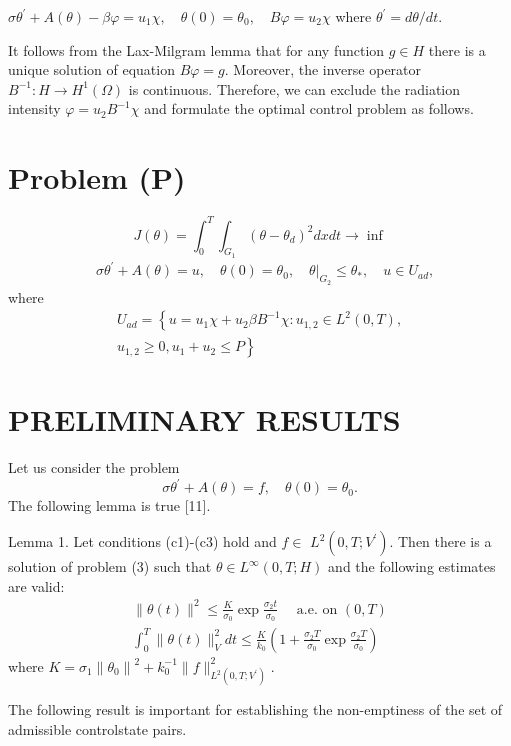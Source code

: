 \documentclass[10pt]{article}
\begin{document}
$\sigma \theta^{\prime}+A(\theta)-\beta \varphi=u_{1} \chi, \quad \theta(0)=\theta_{0}, \quad B \varphi=u_{2} \chi$ where $\theta^{\prime}=d \theta / d t$.

It follows from the Lax-Milgram lemma that for any function $g \in H$ there is a unique solution of equation $B \varphi=g$. Moreover, the inverse operator $B^{-1}: H \rightarrow H^{1}(\Omega)$ is continuous. Therefore, we can exclude the radiation intensity $\varphi=u_{2} B^{-1} \chi$ and formulate the optimal control problem as follows.

\section{Problem (P)}
$$
J(\theta)=\int_{0}^{T} \int_{G_{1}}\left(\theta-\theta_{d}\right)^{2} d x d t \rightarrow \inf
$$
$$
\begin{aligned}
& \sigma \theta^{\prime}+A(\theta)=u, \quad \theta(0)=\theta_{0},\left.\quad \theta\right|_{G_{2}} \leq \theta_{*}, \quad u \in U_{a d},
\end{aligned}
$$
where
$$
\begin{array}{r}
U_{a d}=\left\{u=u_{1} \chi+u_{2} \beta B^{-1} \chi: u_{1,2} \in L^{2}(0, T),\right. \\
\left.u_{1,2} \geq 0, u_{1}+u_{2} \leq P\right\}
\end{array}
$$

\section{PRELIMINARY RESULTS}
Let us consider the problem
$$
\sigma \theta^{\prime}+A(\theta)=f, \quad \theta(0)=\theta_{0} .
$$
The following lemma is true [11].

Lemma 1. Let conditions (c1)-(c3) hold and $f \in$ $L^{2}\left(0, T ; V^{\prime}\right)$. Then there is a solution of problem (3) such that $\theta \in L^{\infty}(0, T ; H)$ and the following estimates are valid:
$$
\begin{gathered}
\|\theta(t)\|^{2} \leq \frac{K}{\sigma_{0}} \exp \frac{\sigma_{2} t}{\sigma_{0}} \quad \text { a.e. on }(0, T) \\
\int_{0}^{T}\|\theta(t)\|_{V}^{2} d t \leq \frac{K}{k_{0}}\left(1+\frac{\sigma_{2} T}{\sigma_{0}} \exp \frac{\sigma_{2} T}{\sigma_{0}}\right)
\end{gathered}
$$
where $K=\sigma_{1}\left\|\theta_{0}\right\|^{2}+k_{0}^{-1}\|f\|_{L^{2}\left(0, T ; V^{\prime}\right)}^{2}$.

The following result is important for establishing the non-emptiness of the set of admissible controlstate pairs.
\end{document}
